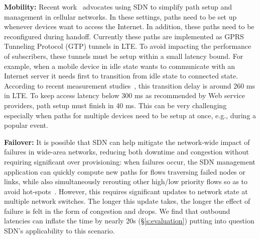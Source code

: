 {\bf Mobility: } Recent work~\cite{softcell} advocates using SDN to
simplify path setup and management in cellular networks. In these
settings, paths need to be set up whenever devices want to access the
Internet. In addition, these paths need to be reconfigured during
handoff. Currently these
paths are implemented as GPRS Tunneling Protocol (GTP) tunnels in LTE.
To avoid impacting the performance of subscribers, these tunnels must be setup
within a small latency bound. 
For example, when a mobile device in
idle state wants to communicate with an Internet server it needs first
to transition from idle state to connected state. According to recent
measurement studies~\cite{MorleyMobisys2012}, this transition delay is
around 260 ms in LTE. To keep access latency below 300 ms as
recommended by Web service providers, path setup must finish in 
40 ms. This can be very challenging especially when paths for multiple
devices need to be setup at once, e.g., during a popular event.

{\bf Failover: } %
It is possible that SDN can help mitigate the network-wide impact of
failures in wide-area networks, reducing both downtime and congestion
without requiring significant over provisioning: when failures occur,
the SDN management application can quickly compute new paths for flows
traversing failed nodes or links, while also simultaneously rerouting
other high/low priority flows so as to avoid hot-spots~\cite{swan}.
However, this requires significant updates to network state at
multiple network switches. The longer this update takes, the longer
the effect of failure is felt in the form of congestion and drops. We
find that outbound latencies can inflate the time by nearly 20s
(\S\ref{s:evaluation}) putting into question SDN's applicability to
this scenario. 



